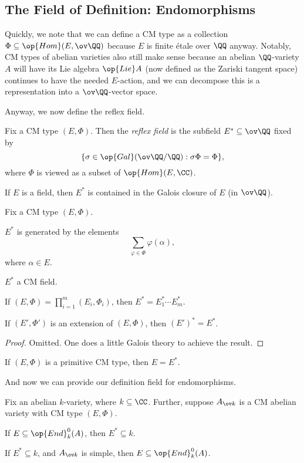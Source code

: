 \documentclass[../notes.tex]{subfiles}
\begin{document}
\subsection{The Field of Definition: Endomorphisms}
Quickly, we note that we can define a CM type as a collection $\Phi\subseteq\op{Hom}(E,\ov\QQ)$ because $E$ is finite \'etale over $\QQ$ anyway. Notably, CM types of abelian varieties also still make sense because an abelian $\QQ$-variety $A$ will have its Lie algebra $\op{Lie}A$ (now defined as the Zariski tangent space) continues to have the needed $E$-action, and we can decompose this is a representation into a $\ov\QQ$-vector space.

Anyway, we now define the reflex field.
\begin{definition}
	Fix a CM type $(E,\Phi)$. Then the \textit{reflex field} is the subfield $E^*\subseteq\ov\QQ$ fixed by
	\[\{\sigma\in\op{Gal}(\ov\QQ/\QQ):\sigma\Phi=\Phi\},\]
	where $\Phi$ is viewed as a subset of $\op{Hom}(E,\CC)$.
\end{definition}
\begin{remark}
	If $E$ is a field, then $E^*$ is contained in the Galois closure of $E$ (in $\ov\QQ$).
\end{remark}
\begin{lemma} \label{lem:how-to-reflex}
	Fix a CM type $(E,\Phi)$.
	\begin{listalph}
		\item $E^*$ is generated by the elements
		\[\sum_{\varphi\in\Phi}\varphi(\alpha),\]
		where $\alpha\in E$.
		\item $E^*$ a CM field.
		\item If $(E,\Phi)=\prod_{i=1}^m(E_i,\Phi_i)$, then $E^*=E_1^*\cdots E_m^*$.
		\item If $(E',\Phi')$ is an extension of $(E,\Phi)$, then $(E')^*=E^*$.
	\end{listalph}
\end{lemma}
\begin{proof}
	Omitted. One does a little Galois theory to achieve the result.
\end{proof}
\begin{example}
	If $(E,\Phi)$ is a primitive CM type, then $E=E^*$.
\end{example}
And now we can provide our definition field for endomorphisms.
\begin{proposition}
	Fix an abelian $k$-variety, where $k\subseteq\CC$. Further, suppose $A_{\ov k}$ is a CM abelian variety with CM type $(E,\Phi)$.
	\begin{listalph}
		\item If $E\subseteq\op{End}^0_k(A)$, then $E^*\subseteq k$.
		\item If $E^*\subseteq k$, and $A_{\ov k}$ is simple, then $E\subseteq\op{End}^0_k(A)$.
	\end{listalph}
\end{proposition}
\end{document}
